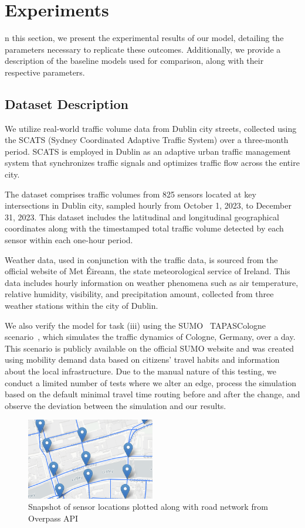 \section{Experiments}\label{sec:experiments}
n this section, we present the experimental results of our model, detailing the parameters necessary to replicate these outcomes. Additionally, we provide a description of the baseline models used for comparison, along with their respective parameters.

\subsection{Dataset Description}

We utilize real-world traffic volume data from Dublin city streets, collected using the SCATS (Sydney Coordinated Adaptive Traffic System) over a three-month period. SCATS is employed in Dublin as an adaptive urban traffic management system that synchronizes traffic signals and optimizes traffic flow across the entire city.

The dataset comprises traffic volumes from 825 sensors located at key intersections in Dublin city, sampled hourly from October 1, 2023, to December 31, 2023. This dataset includes the latitudinal and longitudinal geographical coordinates along with the timestamped total traffic volume detected by each sensor within each one-hour period.

Weather data, used in conjunction with the traffic data, is sourced from the official website of Met Éireann, the state meteorological service of Ireland. This data includes hourly information on weather phenomena such as air temperature, relative humidity, visibility, and precipitation amount, collected from three weather stations within the city of Dublin.

We also verify the model for task (iii) using the SUMO~\cite{sumo} TAPASCologne scenario~\cite{tapas}, which simulates the traffic dynamics of Cologne, Germany, over a day. This scenario is publicly available on the official SUMO website and was created using mobility demand data based on citizens' travel habits and information about the local infrastructure. Due to the manual nature of this testing, we conduct a limited number of tests where we alter an edge, process the simulation based on the default minimal travel time routing before and after the change, and observe the deviation between the simulation and our results.

\begin{figure}[htbp]
  \centering
  \includegraphics[width=0.5\textwidth]{dataset.png}
  \caption{Snapshot of sensor locations plotted along with road network from Overpass API}
  \label{fig:dataset}
\end{figure}


